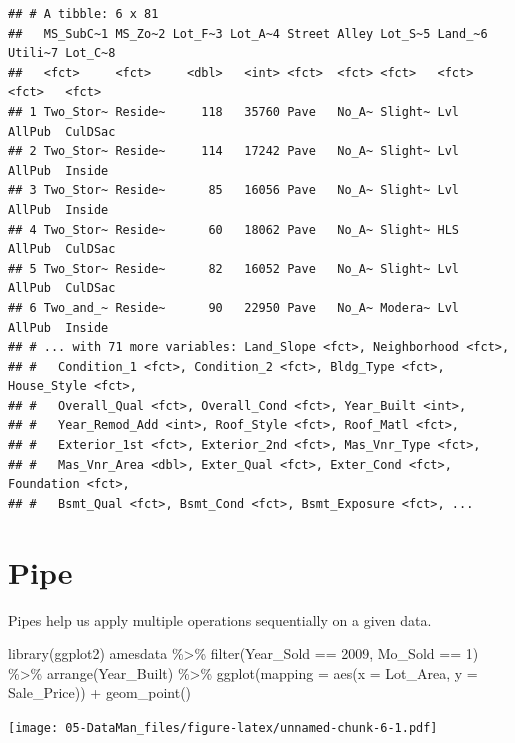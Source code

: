 \documentclass[
]{book}
\newenvironment{Shaded}{\begin{snugshade}}{\end{snugshade}}
\newcommand{\AttributeTok}[1]{\textcolor[rgb]{0.77,0.63,0.00}{#1}}
\newcommand{\DecValTok}[1]{\textcolor[rgb]{0.00,0.00,0.81}{#1}}
\newcommand{\FunctionTok}[1]{\textcolor[rgb]{0.00,0.00,0.00}{#1}}
\newcommand{\NormalTok}[1]{#1}
\newcommand{\SpecialCharTok}[1]{\textcolor[rgb]{0.00,0.00,0.00}{#1}}
\begin{document}
\begin{verbatim}
## # A tibble: 6 x 81
##   MS_SubC~1 MS_Zo~2 Lot_F~3 Lot_A~4 Street Alley Lot_S~5 Land_~6 Utili~7 Lot_C~8
##   <fct>     <fct>     <dbl>   <int> <fct>  <fct> <fct>   <fct>   <fct>   <fct>  
## 1 Two_Stor~ Reside~     118   35760 Pave   No_A~ Slight~ Lvl     AllPub  CulDSac
## 2 Two_Stor~ Reside~     114   17242 Pave   No_A~ Slight~ Lvl     AllPub  Inside 
## 3 Two_Stor~ Reside~      85   16056 Pave   No_A~ Slight~ Lvl     AllPub  Inside 
## 4 Two_Stor~ Reside~      60   18062 Pave   No_A~ Slight~ HLS     AllPub  CulDSac
## 5 Two_Stor~ Reside~      82   16052 Pave   No_A~ Slight~ Lvl     AllPub  CulDSac
## 6 Two_and_~ Reside~      90   22950 Pave   No_A~ Modera~ Lvl     AllPub  Inside 
## # ... with 71 more variables: Land_Slope <fct>, Neighborhood <fct>,
## #   Condition_1 <fct>, Condition_2 <fct>, Bldg_Type <fct>, House_Style <fct>,
## #   Overall_Qual <fct>, Overall_Cond <fct>, Year_Built <int>,
## #   Year_Remod_Add <int>, Roof_Style <fct>, Roof_Matl <fct>,
## #   Exterior_1st <fct>, Exterior_2nd <fct>, Mas_Vnr_Type <fct>,
## #   Mas_Vnr_Area <dbl>, Exter_Qual <fct>, Exter_Cond <fct>, Foundation <fct>,
## #   Bsmt_Qual <fct>, Bsmt_Cond <fct>, Bsmt_Exposure <fct>, ...
\end{verbatim}

\hypertarget{pipe}{%
\section{Pipe}\label{pipe}}

Pipes help us apply multiple operations sequentially on a given data.

\begin{Shaded}
\begin{Highlighting}[]
\FunctionTok{library}\NormalTok{(ggplot2)}
\NormalTok{amesdata }\SpecialCharTok{\%\textgreater{}\%} 
  \FunctionTok{filter}\NormalTok{(Year\_Sold }\SpecialCharTok{==} \DecValTok{2009}\NormalTok{, Mo\_Sold }\SpecialCharTok{==} \DecValTok{1}\NormalTok{) }\SpecialCharTok{\%\textgreater{}\%} 
  \FunctionTok{arrange}\NormalTok{(Year\_Built) }\SpecialCharTok{\%\textgreater{}\%}
  \FunctionTok{ggplot}\NormalTok{(}\AttributeTok{mapping =} \FunctionTok{aes}\NormalTok{(}\AttributeTok{x =}\NormalTok{ Lot\_Area, }\AttributeTok{y =}\NormalTok{ Sale\_Price)) }\SpecialCharTok{+} 
  \FunctionTok{geom\_point}\NormalTok{()}
\end{Highlighting}
\end{Shaded}

\texttt{[image: 05-DataMan\_files/figure-latex/unnamed-chunk-6-1.pdf]}
\end{document}
